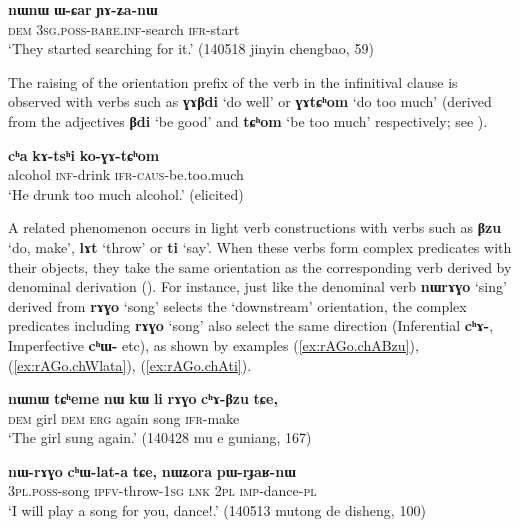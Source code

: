 \documentclass[oneside,a4paper,11pt]{article}
\newcommand{\ipa}[1]{\textbf{\phon#1}} %
\newcommand{\jpg}[2]{\ipa{#1} `#2'} %
\newcommand{\refb}[1]{(\ref{#1})}
\begin{document}
\begin{exe}
\ex \label{ex:YAZa}
\gll
\ipa{nɯnɯ} 	\ipa{ɯ-ɕar} 	\ipa{ɲɤ-ʑa-nɯ} \\
\textsc{dem} \textsc{3sg.poss-bare.inf}-search \textsc{ifr}-start \\
\glt `They started searching for it.' (140518 jinyin chengbao, 59)
\end{exe}

The raising of the orientation prefix of the verb in the infinitival clause is observed with verbs such as \jpg{ɣɤβdi}{do well} or \jpg{ɣɤtɕʰom}{do too much} (derived from the adjectives \jpg{βdi}{be good} and \jpg{tɕʰom}{be too much} respectively; see \citealt[184]{jacques15causative}).

\begin{exe}
\ex 
\gll \ipa{cʰa} 	\ipa{kɤ-tsʰi} 	\ipa{ko-ɣɤ-tɕʰom} \\
alcohol \textsc{inf}-drink \textsc{ifr-caus}-be.too.much \\
\glt `He drunk too much alcohol.' (elicited)
\end{exe}

A related phenomenon occurs in light verb constructions with verbs such as \jpg{βzu}{do, make}, \jpg{lɤt}{throw} or \jpg{ti}{say}. When these verbs form complex predicates with their objects, they take the same orientation as the corresponding verb derived by denominal derivation (\citealt[1220]{jacques12incorp}). For instance, just like the denominal verb \jpg{nɯrɤɣo}{sing} derived from \jpg{rɤɣo}{song} selects the `downstream' orientation, the complex predicates including \jpg{rɤɣo}{song} also select the same direction (Inferential \ipa{cʰɤ-}, Imperfective \ipa{cʰɯ-} etc), as shown by examples \refb{ex:rAGo.chABzu}, \refb{ex:rAGo.chWlata}, \refb{ex:rAGo.chAti}.

\begin{exe}
\ex \label{ex:rAGo.chABzu}
\gll \ipa{nɯnɯ} 	\ipa{tɕʰeme} 	\ipa{nɯ} 	\ipa{kɯ} 	\ipa{li} 	\ipa{rɤɣo} 	\ipa{cʰɤ-βzu} 	\ipa{tɕe,} \\
\textsc{dem} girl \textsc{dem} \textsc{erg} again song \textsc{ifr}-make \\
\glt `The girl sung again.' (140428 mu e guniang, 167)
\end{exe}

\begin{exe}
\ex \label{ex:rAGo.chWlata}
\gll 
\ipa{nɯ-rɤɣo} 	\ipa{cʰɯ-lat-a} 	\ipa{tɕe,} 	\ipa{nɯʑora} 	\ipa{pɯ-rɟaʁ-nɯ} \\
\textsc{3pl.poss}-song \textsc{ipfv}-throw-\textsc{1sg} \textsc{lnk} \textsc{2pl} \textsc{imp}-dance-\textsc{pl} \\
\glt `I will play a song for you, dance!.' (140513 mutong de disheng, 100)
\end{exe}
\end{document}
